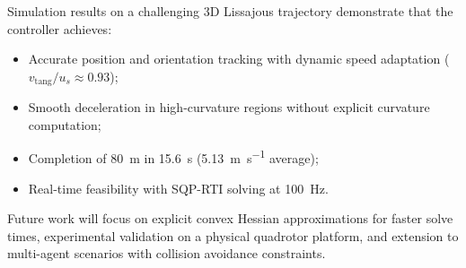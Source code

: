 \documentclass[journal]{IEEEtran}
\begin{document}
Simulation results on a challenging 3D Lissajous trajectory demonstrate that the controller achieves:
\begin{itemize}
    \item Accurate position and orientation tracking with dynamic speed adaptation ($v_\text{tang}/u_s \approx 0.93$);
    \item Smooth deceleration in high-curvature regions without explicit curvature computation;
    \item Completion of \SI{80}{\meter} in \SI{15.6}{\second} (\SI{5.13}{\meter\per\second} average);
    \item Real-time feasibility with SQP-RTI solving at \SI{100}{\hertz}.
\end{itemize}

Future work will focus on explicit convex Hessian approximations for faster solve times, experimental validation on a physical quadrotor platform, and extension to multi-agent scenarios with collision avoidance constraints.


\end{document}
